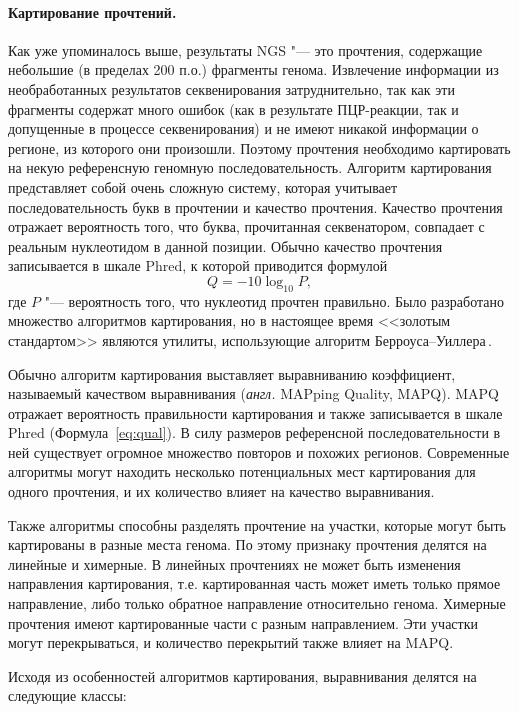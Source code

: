 \documentclass[a4paper,14pt]{extarticle}
\newcommand{\formula}[1]{Формула~\ref{#1}}
\newcommand{\anglia}[1]{\textit{англ.} \textenglish{#1}}
\begin{document}
\paragraph{Картирование прочтений.}
Как уже упоминалось выше, результаты NGS "--- это прочтения, содержащие небольшие (в пределах 200 п.о.) фрагменты генома.
Извлечение информации из необработанных результатов секвенирования затруднительно, так как эти фрагменты содержат много ошибок (как в результате ПЦР\hyp{}реакции, так и допущенные в процессе секвенирования) и не имеют никакой информации о регионе, из которого они произошли.
Поэтому прочтения необходимо картировать на некую референсную геномную последовательность.
Алгоритм картирования представляет собой очень сложную систему, которая учитывает последовательность букв в прочтении и качество прочтения.
Качество прочтения отражает вероятность того, что буква, прочитанная секвенатором, совпадает с реальным нуклеотидом в данной позиции.
Обычно качество прочтения записывается в шкале Phred, к которой приводится формулой \begin{equation}Q = -10\log_{10}P,\label{eq:qual}\end{equation} где $P$ "--- вероятность того, что нуклеотид прочтен правильно.
Было разработано множество алгоритмов картирования, но в настоящее время <<золотым стандартом>> являются утилиты, использующие алгоритм Берроуса--Уиллера\,\cite{Burrows_1994}.

Обычно алгоритм картирования выставляет выравниванию коэффициент, называемый качеством выравнивания (\anglia{MAPping Quality, MAPQ}).
MAPQ отражает вероятность правильности картирования и также записывается в шкале Phred (\formula{eq:qual}).
В силу размеров референсной последовательности в ней существует огромное множество повторов и похожих регионов.
Современные алгоритмы могут находить несколько потенциальных мест картирования для одного прочтения, и их количество влияет на качество выравнивания.

Также алгоритмы способны разделять прочтение на участки, которые могут быть картированы в разные места генома.
По этому признаку прочтения делятся на линейные и химерные.
В линейных прочтениях не может быть изменения направления картирования, т.е. картированная часть может иметь только прямое направление, либо только обратное направление относительно генома.
Химерные прочтения имеют картированные части с разным направлением.
Эти участки могут перекрываться, и количество перекрытий также влияет на MAPQ.

Исходя из особенностей алгоритмов картирования, выравнивания делятся на следующие классы:
\end{document}
